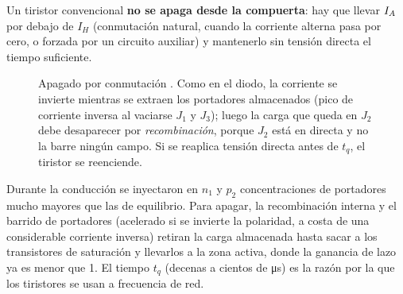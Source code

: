 Un tiristor convencional \textbf{no se apaga desde la compuerta}: hay que llevar $I_{A}$ por debajo
de $I_H$ (conmutación natural, cuando la corriente alterna pasa por cero, o forzada por un circuito
auxiliar) y mantenerlo sin tensión directa el tiempo suficiente.

\begin{figure}[H]
\centering
{}
\caption{Apagado por conmutación . Como en el diodo, la corriente se invierte mientras se
extraen los portadores almacenados (pico de corriente inversa al vaciarse $J_1$ y $J_3$); luego la
carga que queda en $J_2$ debe desaparecer por \emph{recombinación}, porque $J_2$ está en directa y
no la barre ningún campo. Si se reaplica tensión directa antes de $t_q$, el tiristor se reenciende.}
\label{fig:tiristor-apagado}
\end{figure}

 Durante la conducción se inyectaron en $n_1$ y $p_2$ concentraciones de portadores
mucho mayores que las de equilibrio. Para apagar, la recombinación interna y el barrido de
portadores (acelerado si se invierte la polaridad, a costa de una considerable corriente inversa)
retiran la carga almacenada hasta sacar a los transistores de saturación y llevarlos a la zona
activa, donde la ganancia de lazo ya es menor que 1. El tiempo $t_q$ (decenas a cientos de
\si{\micro s}) es la razón por la que los tiristores se usan a frecuencia de red.

